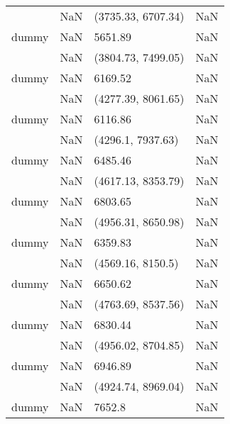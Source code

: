 \begin{tabular}{llll}
                &                     NaN &     (3735.33, 6707.34) &                   NaN \\
dummy           &                     NaN &                5651.89 &                   NaN \\
                &                     NaN &     (3804.73, 7499.05) &                   NaN \\
dummy           &                     NaN &                6169.52 &                   NaN \\
                &                     NaN &     (4277.39, 8061.65) &                   NaN \\
dummy           &                     NaN &                6116.86 &                   NaN \\
                &                     NaN &      (4296.1, 7937.63) &                   NaN \\
dummy           &                     NaN &                6485.46 &                   NaN \\
                &                     NaN &     (4617.13, 8353.79) &                   NaN \\
dummy           &                     NaN &                6803.65 &                   NaN \\
                &                     NaN &     (4956.31, 8650.98) &                   NaN \\
dummy           &                     NaN &                6359.83 &                   NaN \\
                &                     NaN &      (4569.16, 8150.5) &                   NaN \\
dummy           &                     NaN &                6650.62 &                   NaN \\
                &                     NaN &     (4763.69, 8537.56) &                   NaN \\
dummy           &                     NaN &                6830.44 &                   NaN \\
                &                     NaN &     (4956.02, 8704.85) &                   NaN \\
dummy           &                     NaN &                6946.89 &                   NaN \\
                &                     NaN &     (4924.74, 8969.04) &                   NaN \\
dummy           &                     NaN &                 7652.8 &                   NaN \\

\end{tabular}
